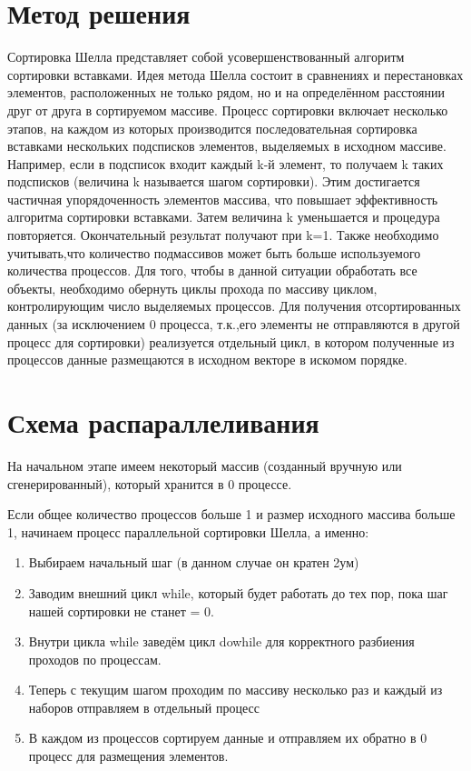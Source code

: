 \documentclass{report}
\begin{document}
\section*{Метод решения}
\par Сортировка Шелла представляет собой усовершенствованный алгоритм сортировки вставками. Идея метода Шелла состоит в сравнениях и перестановках элементов, расположенных не только рядом, но и на определённом расстоянии друг от друга в сортируемом массиве. Процесс сортировки включает несколько этапов, на каждом из которых производится последовательная сортировка вставками нескольких подсписков элементов, выделяемых в исходном массиве. Например, если в подсписок входит каждый k-й элемент, то получаем k таких подсписков (величина k называется шагом сортировки). Этим достигается частичная упорядоченность элементов массива, что повышает эффективность алгоритма сортировки вставками. Затем величина k уменьшается и процедура повторяется. Окончательный результат получают при k=1. Также необходимо учитывать,что количество подмассивов может быть больше используемого количества процессов. Для того, чтобы в данной ситуации обработать
все объекты, необходимо обернуть циклы прохода по массиву циклом, контролирующим число выделяемых процессов. Для получения отсортированных данных (за исключением 0 процесса, т.к.,его элементы не отправляются в другой процесс для сортировки) реализуется отдельный цикл, в котором полученные из процессов данные размещаются в исходном векторе в искомом порядке.
\newpage
\section*{Схема распараллеливания}
На начальном этапе имеем некоторый массив (созданный вручную или сгенерированный), который хранится в 0 процессе.

Если общее количество процессов больше 1 и размер исходного массива больше 1, начинаем процесс параллельной сортировки Шелла, а именно:
\begin{enumerate} 
\item Выбираем начальный шаг (в данном случае он кратен 2ум)
\item Заводим внешний цикл while, который будет работать до тех пор, пока шаг нашей сортировки не станет = 0.
\item Внутри цикла while заведём цикл do{}while для корректного разбиения проходов по процессам.
\item Теперь с текущим шагом проходим по массиву несколько раз и каждый из наборов отправляем в отдельный процесс
\item В каждом из процессов сортируем данные и отправляем их обратно в 0 процесс для размещения элементов.

\end{enumerate}
\newpage
\end{document}
